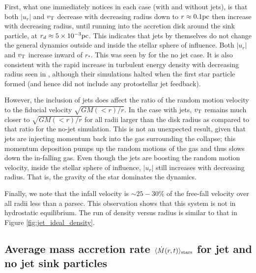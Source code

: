 \documentclass[../dissertation.tex]{subfiles}
\begin{document}
First, what one immediately notices in each case (with and without jets), is that both $\lvert u_r \rvert$ and $v_{\rm T}$ decrease with decreasing radius down to $r \approx 0.1 {\rm pc}$ then increase with decreasing radius, until running into the accretion disk around the sink particle, at $r_d \approx 5\times 10^{-3} {\rm pc}$.
This indicates that jets by themselves do not change the general dynamics outside and inside the stellar sphere of influence.
 Both $\lvert u_r \rvert$ and $v_{\rm T}$ increase inward of $r_*$. This was seen by \citet{2017MNRAS.465.1316M} for the no jet case.
It is also consistent with the rapid increase in turbulent energy density with decreasing radius seen in \citet{2017ApJ...838...40M}, although their simulations halted when the first star particle formed (and hence did not include any protostellar jet feedback).

However, the inclusion of jets does affect the ratio of the random motion velocity to the fiducial velocity $\sqrt{GM(<r)/r}$.
In the case with jets, $v_{\rm T}$ remains much closer to $\sqrt{GM(<r)/r}$ for all radii larger than the disk radius as compared to that ratio for the no-jet simulation.
This is not an unexpected result, given that jets are injecting momentum back into the gas surrounding the collapse; this momentum deposition pumps up the random motions of the gas and thus slows down the in-falling gas.
Even though the jets are boosting the random motion velocity, inside the stellar sphere of influence, $\lvert u_r \rvert$ still increases with decreasing radius. That is, the gravity of the star dominates the dynamics.%


Finally, we note that the infall velocity is $\sim 25 - 30 \%$ of the free-fall velocity over all radii less than a parsec. This observation shows that this system is not in hydrostatic equilibrium. The run of density versus radius is similar to that in Figure \ref{fig:jet_ideal_density}.

\subsection{Average mass accretion rate $\langle \dot{M}(r, t) \rangle_{\rm stars}$ for jet and no jet sink particles} \label{subsec:jet_mdotstars}
\end{document}
